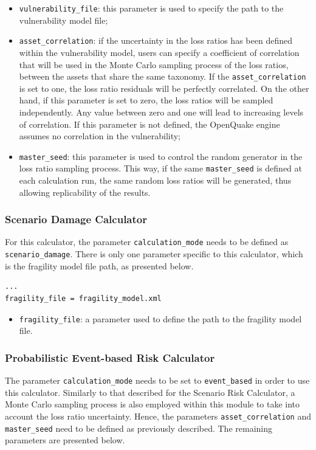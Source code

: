 \begin{itemize}
\item  \Verb+vulnerability_file+: this parameter is used to specify the path to the \gls{vulnerability model} file;
\item  \Verb+asset_correlation+: if the uncertainty in the loss ratios has been defined within the \gls{vulnerability model}, users can specify a coefficient of correlation that will be used in the Monte Carlo sampling process of the loss ratios, between the assets that share the same \gls{taxonomy}. If the \Verb+asset_correlation+ is set to one, the loss ratio residuals will be perfectly correlated. On the other hand, if this parameter is set to zero, the loss ratios will be sampled independently. Any value between zero and one will lead to increasing levels of correlation. If this parameter is not defined, the OpenQuake engine assumes no correlation in the vulnerability;
\item  \Verb+master_seed+: this parameter is used to control the random generator in the loss ratio sampling process. This way, if the same \Verb+master_seed+ is defined at each calculation run, the same random loss ratios will be generated, thus allowing replicability of the results.
\end{itemize}

\subsubsection{Scenario Damage Calculator}
For this calculator, the parameter \Verb+calculation_mode+ needs to be defined as \Verb+scenario_damage+. There is only one parameter specific to this calculator, which is the \gls{fragility model} file path, as presented below.

\begin{Verbatim}[frame=single, commandchars=\\\{\}, samepage=true]
...
fragility_file = fragility_model.xml
\end{Verbatim}

\begin{itemize}
\item  \Verb+fragility_file+: a parameter used to define the path to the \gls{fragility model} file.
\end{itemize}

\subsubsection{Probabilistic Event-based Risk Calculator}
The parameter \Verb+calculation_mode+ needs to be set to \Verb+event_based+ in order to use this calculator. Similarly to that described for the Scenario Risk Calculator, a Monte Carlo sampling process is also employed within this module to take into account the loss ratio uncertainty. Hence, the parameters \Verb+asset_correlation+ and \Verb+master_seed+ need to be defined as previously described. The remaining parameters are presented below.

